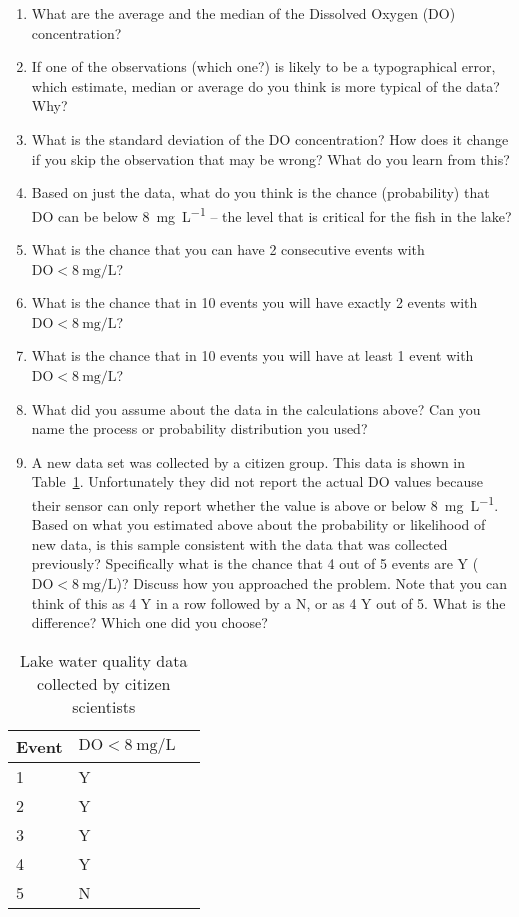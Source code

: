\documentclass[paper=letter, fontsize=11pt]{scrartcl}
\numberwithin{equation}{section}
\numberwithin{figure}{section}
\numberwithin{table}{section}
\begin{document}
\begin{enumerate}[resume]
  \item What are the average  and the median of the Dissolved Oxygen (DO) concentration?
  \item If one of the observations (which one?) is likely to be a typographical error, which estimate, median or average do you think is more typical of the data? Why?
  \item What is the standard deviation of the DO concentration? How does it change if you skip the observation that may be wrong? What do you learn from this?
  \item Based on just the data, what do you think is the chance (probability) that DO can be below \SI{8}{\milli\gram\per\liter} -- the level that is critical for the fish in the lake?
  \item What is the chance that you can have 2 consecutive events with $\text{DO}<\SI{8}{\milli\gram\per\liter}$?
  \item What is the chance that in 10 events you will have exactly 2 events with $\text{DO}<\SI{8}{\milli\gram\per\liter}$?
  \item What is the chance that in 10 events you will have at least 1 event with $\text{DO}<\SI{8}{\milli\gram\per\liter}$?\
  \item What did you assume about the data in the calculations above? Can you name the process or probability distribution you used?
  \item A new data set was collected by a citizen group.
  This data is shown in Table~\ref{tab:lake-data-citizen}.
  Unfortunately they did not report the actual DO values because their sensor can only report whether the value is above or below \SI{8}{\milli\gram\per\liter}.
  Based on what you estimated above about the probability or likelihood of new data, is this sample consistent with the data that was collected previously?
  Specifically what is the chance that 4 out of 5 events are Y ($\text{DO}<\SI{8}{\milli\gram\per\liter}$)?
  Discuss how you approached the problem.
  Note that you can think of this as 4 Y in a row followed by a N, or as 4 Y out of 5.
  What is the difference? Which one did you choose?
\end{enumerate}
\begin{table}[h]
  \centering
  \begin{tabular}{l l l}
    \toprule
    Event & $\text{DO}<\SI{8}{\milli\gram\per\liter}$ \\
    \midrule
    1 & Y \\
    2 & Y \\
    3 & Y \\
    4 & Y \\
    5 & N \\
    \bottomrule
  \end{tabular}
  \caption{Lake water quality data collected by citizen scientists \label{tab:lake-data-citizen}}
\end{table}
\end{document}
